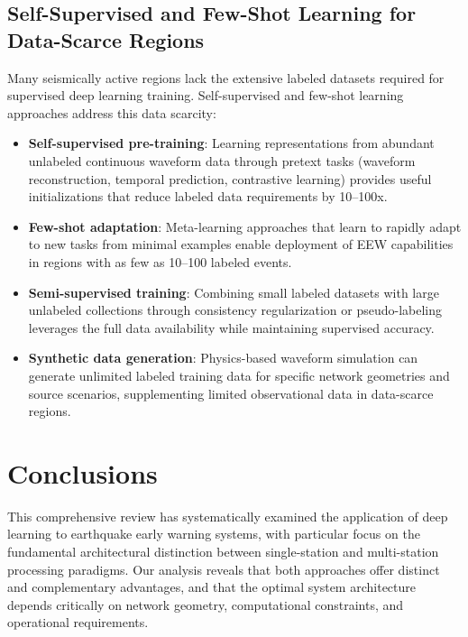 \documentclass[review,authoryear]{elsarticle}
\begin{document}
\subsection{Self-Supervised and Few-Shot Learning for Data-Scarce Regions}

Many seismically active regions lack the extensive labeled datasets required for supervised deep learning training. Self-supervised and few-shot learning approaches address this data scarcity:

\begin{itemize}
\item \textbf{Self-supervised pre-training}: Learning representations from abundant unlabeled continuous waveform data through pretext tasks (waveform reconstruction, temporal prediction, contrastive learning) provides useful initializations that reduce labeled data requirements by 10--100x.
\item \textbf{Few-shot adaptation}: Meta-learning approaches that learn to rapidly adapt to new tasks from minimal examples enable deployment of EEW capabilities in regions with as few as 10--100 labeled events.
\item \textbf{Semi-supervised training}: Combining small labeled datasets with large unlabeled collections through consistency regularization or pseudo-labeling leverages the full data availability while maintaining supervised accuracy.
\item \textbf{Synthetic data generation}: Physics-based waveform simulation can generate unlimited labeled training data for specific network geometries and source scenarios, supplementing limited observational data in data-scarce regions.
\end{itemize}


\section{Conclusions}
\label{sec:conclusions}

This comprehensive review has systematically examined the application of deep learning to earthquake early warning systems, with particular focus on the fundamental architectural distinction between single-station and multi-station processing paradigms. Our analysis reveals that both approaches offer distinct and complementary advantages, and that the optimal system architecture depends critically on network geometry, computational constraints, and operational requirements.
\end{document}
